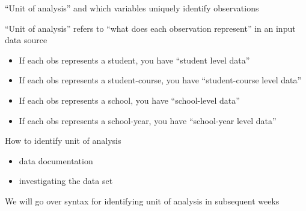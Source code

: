 \documentclass[8pt,ignorenonframetext,dvipsnames]{beamer}
\providecommand{\tightlist}{%
  \setlength{\itemsep}{0pt}\setlength{\parskip}{0pt}}
\let\olditem\item
\renewcommand{\item}{%
  \olditem\vspace{4pt}
}
\begin{document}
\begin{frame}{``Unit of analysis'' and which variables uniquely identify
observations}

``Unit of analysis'' refers to ``what does each observation represent''
in an input data source

\begin{itemize}
\tightlist
\item
  If each obs represents a student, you have ``student level data''
\item
  If each obs represents a student-course, you have ``student-course
  level data''
\item
  If each obs represents a school, you have ``school-level data''
\item
  If each obs represents a school-year, you have ``school-year level
  data''
\end{itemize}

How to identify unit of analysis

\begin{itemize}
\tightlist
\item
  data documentation
\item
  investigating the data set
\end{itemize}

We will go over syntax for identifying unit of analysis in subsequent
weeks

\end{frame}
\end{document}
